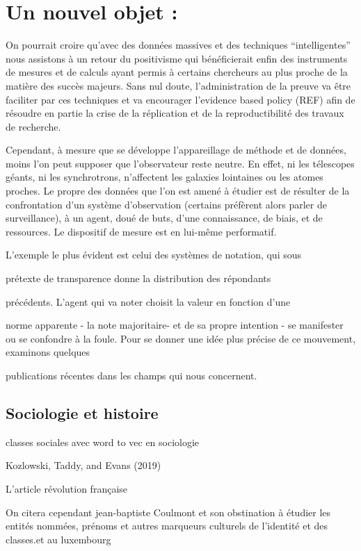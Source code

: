 \documentclass[
  letterpaper,
  DIV=11,
  numbers=noendperiod]{scrreprt}
\begin{document}
\section{Un nouvel objet :}\label{un-nouvel-objet}

On pourrait croire qu'avec des données massives et des techniques
``intelligentes'' nous assistons à un retour du positivisme qui
bénéficierait enfin des instruments de mesures et de calculs ayant
permis à certains chercheurs au plus proche de la matière des succès
majeurs. Sans nul doute, l'administration de la preuve va être faciliter
par ces techniques et va encourager l'evidence based policy (REF) afin
de résoudre en partie la crise de la réplication et de la
reproductibilité des travaux de recherche.

Cependant, à mesure que se développe l'appareillage de méthode et de
données, moins l'on peut supposer que l'observateur reste neutre. En
effet, ni les télescopes géants, ni les synchrotrons, n'affectent les
galaxies lointaines ou les atomes proches. Le propre des données que
l'on est amené à étudier est de résulter de la confrontation d'un
système d'observation (certains préfèrent alors parler de surveillance),
à un agent, doué de buts, d'une connaissance, de biais, et de
ressources. Le dispositif de mesure est en lui-même performatif.

L'exemple le plus évident est celui des systèmes de notation, qui sous

prétexte de transparence donne la distribution des répondants

précédents. L'agent qui va noter choisit la valeur en fonction d'une

norme apparente - la note majoritaire- et de sa propre intention - se
manifester ou se confondre à la foule. Pour se donner une idée plus
précise de ce mouvement, examinons quelques

publications récentes dans les champs qui nous concernent.

\subsection{Sociologie et histoire}\label{sociologie-et-histoire}

classes sociales avec word to vec en sociologie

Kozlowski, Taddy, and Evans (2019)

L'article révolution française

On citera cependant jean-baptiste Coulmont et son obstination à étudier
les entités nommées, prénoms et autres marqueurs culturels de l'identité
et des classes.et au luxembourg
\end{document}
